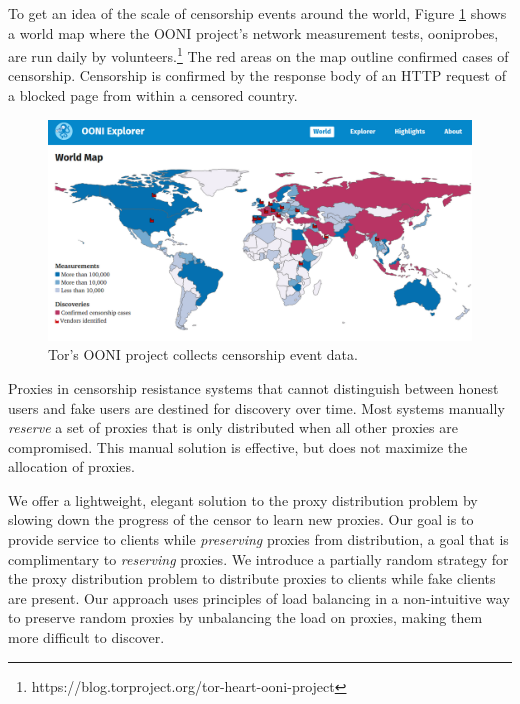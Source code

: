 To get an idea of the scale of censorship events around the world, Figure \ref{fig:oonimap} shows a world map where the OONI project's network measurement tests, ooniprobes, are run daily by volunteers.\footnote{https://blog.torproject.org/tor-heart-ooni-project} The red areas on the map outline confirmed cases of censorship. Censorship is confirmed by the response body of an HTTP request of a blocked page from within a censored country.

\begin{figure}[h!]
\centering
     \includegraphics[width=1.0\textwidth]{fig/ooni_map.png}
    \caption{Tor's OONI project collects censorship event data.}
    
    \label{fig:oonimap}
\end{figure}

Proxies in censorship resistance systems that cannot distinguish between honest users and fake users are destined for discovery over time. Most systems manually \textit{reserve} a set of proxies that is only distributed when all other proxies are compromised. This manual solution is effective, but does not maximize the allocation of proxies. 

We offer a lightweight, elegant solution to the proxy distribution problem by slowing down the progress of the censor to learn new proxies. Our goal is to provide service to clients while \textit{preserving} proxies from distribution, a goal that is complimentary to \textit{reserving} proxies. We introduce a partially random strategy for the proxy distribution problem to distribute proxies to clients while fake clients are present. Our approach uses principles of load balancing in a non-intuitive way to preserve random proxies by unbalancing the load on proxies, making them more difficult to discover. 

